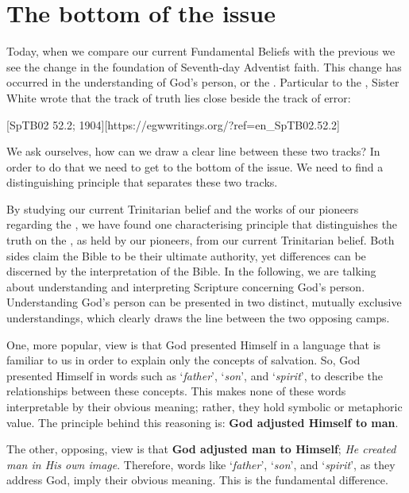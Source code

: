 \chapter{The bottom of the issue}

Today, when we compare our current Fundamental Beliefs with the previous  we see the change in the foundation of Seventh-day Adventist faith. This change has occurred in the understanding of God’s person, or the . Particular to the , Sister White wrote that the track of truth lies close beside the track of error: 

[SpTB02 52.2; 1904][https://egwwritings.org/?ref=en\_SpTB02.52.2]

We ask ourselves, how can we draw a clear line between these two tracks? In order to do that we need to get to the bottom of the issue. We need to find a distinguishing principle that separates these two tracks.

By studying our current Trinitarian belief and the works of our pioneers regarding the , we have found one characterising principle that distinguishes the truth on the , as held by our pioneers, from our current Trinitarian belief. Both sides claim the Bible to be their ultimate authority, yet differences can be discerned by the interpretation of the Bible. In the following, we are talking about understanding and interpreting Scripture concerning God’s person. Understanding God’s person can be presented in two distinct, mutually exclusive understandings, which clearly draws the line between the two opposing camps.

One, more popular, view is that God presented Himself in a language that is familiar to us in order to explain only the concepts of salvation. So, God presented Himself in words such as ‘\textit{father}’, ‘\textit{son}’, and ‘\textit{spirit}’, to describe the relationships between these concepts. This makes none of these words interpretable by their obvious meaning; rather, they hold symbolic or metaphoric value. The principle behind this reasoning is: \textbf{God adjusted Himself to man}.

The other, opposing, view is that \textbf{God adjusted man to Himself}; \textit{He created man in His own image}. Therefore, words like ‘\textit{father}’, ‘\textit{son}’, and ‘\textit{spirit}’, as they address God, imply their obvious meaning. This is the fundamental difference.

